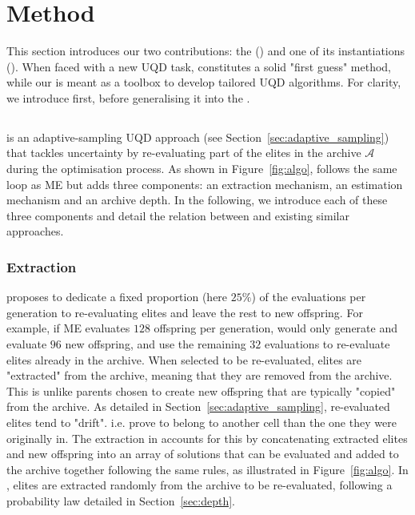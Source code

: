 \section{Method}

This section introduces our two contributions: the \Longframework{} (\framework{}) and one of its instantiations \Longname{} (\name{}). 
When faced with a new UQD task, \name{} constitutes a solid "first guess" method, while our \framework{} is meant as a toolbox to develop tailored UQD algorithms. 
For clarity, we introduce \name{} first, before generalising it into the \framework{}. 


\subsection{\Longname{}}

\name{} is an adaptive-sampling UQD approach (see Section~\ref{sec:adaptive_sampling}) that tackles uncertainty by re-evaluating part of the elites in the archive $\mathcal{A}$ during the optimisation process. 
As shown in Figure~\ref{fig:algo}, \name{} follows the same loop as ME but adds three components: an extraction mechanism, an estimation mechanism and an archive depth. 
In the following, we introduce each of these three components and detail the relation between \name{} and existing similar approaches. 

\subsubsection{Extraction} \label{sec:extraction}
\name{} proposes to dedicate a fixed proportion (here $25\%$) of the evaluations per generation to re-evaluating elites and leave the rest to new offspring. 
For example, if ME evaluates $128$ offspring per generation, \name{} would only generate and evaluate $96$ new offspring, and use the remaining $32$ evaluations to re-evaluate elites already in the archive. 
When selected to be re-evaluated, elites are "extracted" from the archive, meaning that they are removed from the archive. This is unlike parents chosen to create new offspring that are typically "copied" from the archive. 
As detailed in Section~\ref{sec:adaptive_sampling}, re-evaluated elites tend to "drift". i.e. prove to belong to another cell than the one they were originally in. The extraction in \name{} accounts for this by concatenating extracted elites and new offspring into an array of solutions that can be evaluated and added to the archive together following the same rules, as illustrated in Figure~\ref{fig:algo}. 
In \name{}, elites are extracted randomly from the archive to be re-evaluated, following a probability law detailed in Section~\ref{sec:depth}. 


